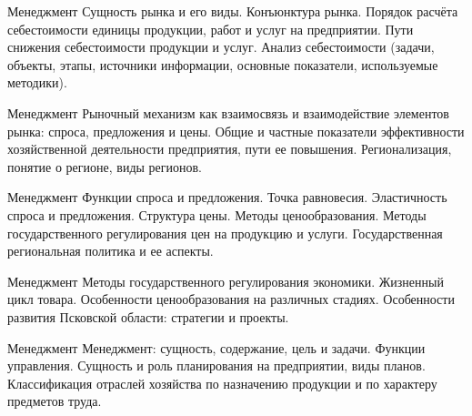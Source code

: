 \documentclass[
	11pt,
	a4paper,
	]
	{article}
\begin{document}
	

\begin{minipage}[t][\miniH]{\miniL}\centering
	 {Менеджмент}
		{
			Сущность рынка и его виды. Конъюнктура рынка.
		}{
			Порядок расчёта себестоимости единицы продукции, работ и услуг на предприятии. Пути снижения себестоимости продукции и услуг.
		}{
			Анализ себестоимости (задачи, объекты, этапы, источники информации, основные показатели, используемые методики).
		}
	\lowGE
\end{minipage}

\vfill



\begin{minipage}[t][\miniH]{\miniL}\centering
	 {Менеджмент}
		{
			Рыночный механизм как взаимосвязь и взаимодействие элементов рынка: спроса, предложения и цены.
		}{
			Общие и частные показатели эффективности хозяйственной деятельности предприятия, пути ее повышения.
		}{
			Регионализация, понятие о регионе, виды регионов.
		}
	\lowGE
\end{minipage}

\vfill



\begin{minipage}[t][\miniH]{\miniL}\centering
	 {Менеджмент}
		{
			Функции спроса и предложения. Точка равновесия. Эластичность спроса и предложения.
		}{
			Структура цены. Методы ценообразования. Методы государственного регулирования цен на продукцию и услуги.
		}{
			Государственная региональная политика и ее аспекты.
		}
	\lowGE
\end{minipage}





\begin{minipage}[t][\miniH]{\miniL}\centering
	 {Менеджмент}
		{
			Методы государственного регулирования экономики.
		}{
			Жизненный цикл товара. Особенности ценообразования на различных стадиях.
		}{
			Особенности развития Псковской области: стратегии и проекты.
		}
	\lowGE
\end{minipage}

\vfill



\begin{minipage}[t][\miniH]{\miniL}\centering
	 {Менеджмент}
		{
			Менеджмент: сущность, содержание, цель и задачи. Функции управления.
		}{
			Сущность и роль планирования на предприятии, виды планов.
		}{
			Классификация отраслей хозяйства по назначению продукции и по характеру предметов труда.
		}
	\lowGE
\end{minipage}
\end{document}

